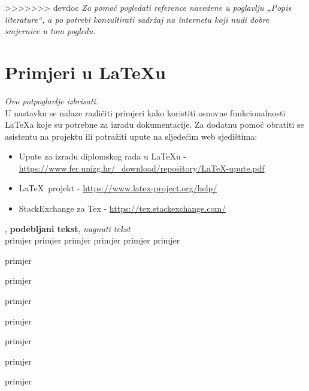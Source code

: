 		
	
		\vspace{5mm}
	
			
>>>>>>> devdoc
		\textit{Za pomoć pogledati reference navedene u poglavlju „Popis literature“, a po potrebi konzultirati sadržaj na internetu koji nudi dobre smjernice u tom pogledu.}
		\eject
		
		\section{Primjeri u \LaTeX u}
		
		\textit{Ovo potpoglavlje izbrisati.}\\

		U nastavku se nalaze različiti primjeri kako koristiti osnovne funkcionalnosti \LaTeX a koje su potrebne za izradu dokumentacije. Za dodatnu pomoć obratiti se asistentu na projektu ili potražiti upute na sljedećim web sjedištima:
		\begin{itemize}
			\item Upute za izradu diplomskog rada u \LaTeX u - \url{https://www.fer.unizg.hr/_download/repository/LaTeX-upute.pdf}
			\item \LaTeX\ projekt - \url{https://www.latex-project.org/help/}
			\item StackExchange za Tex - \url{https://tex.stackexchange.com/}\\
		
		\end{itemize} 	


		
		\noindent {}, \textbf{podebljani tekst}, 	\textit{nagnuti tekst}\\
		\noindent \normalsize primjer \large primjer \Large primjer \LARGE {primjer} \huge {primjer} \Huge primjer \normalsize
				
		\begin{packed_item}
			
			\item  primjer
			\item  primjer
			\item  primjer
			\item[] \begin{packed_enum}
				\item primjer
				\item[] \begin{packed_enum}
					\item[1.a] primjer
					\item[b] primjer
				\end{packed_enum}
				\item primjer
			\end{packed_enum}
			
		\end{packed_item}
		
